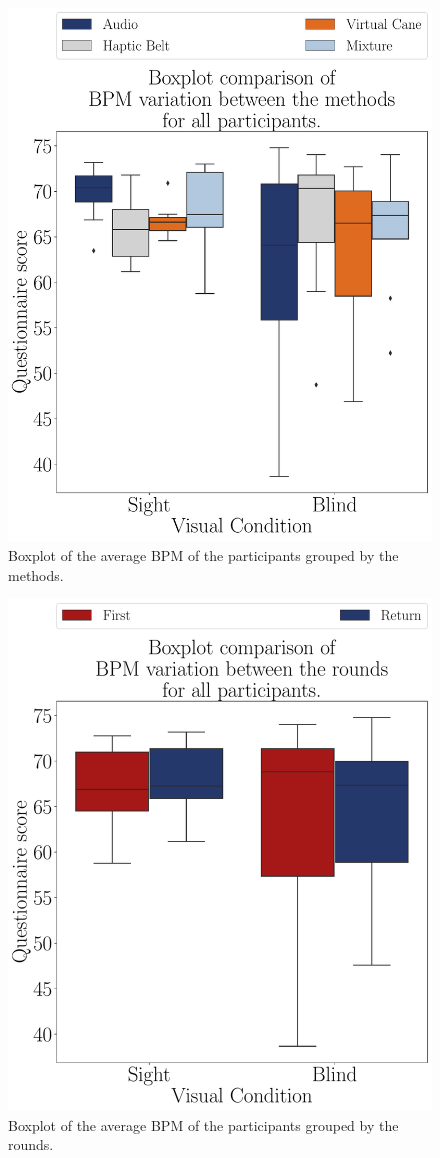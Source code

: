 \begin{figure}[!htb]
    \centering
    \includegraphics[width = 0.75\linewidth]{Resultados/ECG/Figuras/pdf/boxplot_ecg_bpm_4_scene.pdf}
    \caption{Boxplot of the average BPM of the participants grouped by the methods.}
    \label{fig:boxplot_ecg_bpm_4_scene}
\end{figure}
\begin{figure}[!htb]
    \centering
    \includegraphics[width = 0.75\linewidth]{Resultados/ECG/Figuras/pdf/boxplot_ecg_bpm_4_rounds.pdf}
    \caption{Boxplot of the average BPM of the participants grouped by the rounds.}
    \label{fig:boxplot_ecg_bpm_4_rounds}
\end{figure}
 
